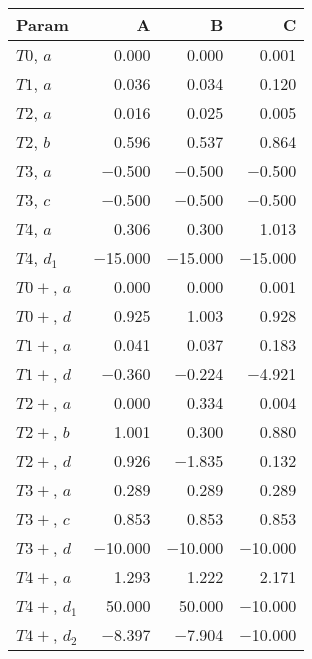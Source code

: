 \begin{tabular}{lrrr}
\toprule
 Param        &       A &       B &       C \\
\midrule
 $T0$, $a$    &   \num{0.000} &   \num{0.000} &   \num{0.001} \\
 $T1$, $a$    &   \num{0.036} &   \num{0.034} &   \num{0.120} \\
 $T2$, $a$    &   \num{0.016} &   \num{0.025} &   \num{0.005} \\
 $T2$, $b$    &   \num{0.596} &   \num{0.537} &   \num{0.864} \\
 $T3$, $a$    &  \num{-0.500} &  \num{-0.500} &  \num{-0.500} \\
 $T3$, $c$    &  \num{-0.500} &  \num{-0.500} &  \num{-0.500} \\
 $T4$, $a$    &   \num{0.306} &   \num{0.300} &   \num{1.013} \\
 $T4$, $d_1$  & \num{-15.000} & \num{-15.000} & \num{-15.000} \\
 $T0+$, $a$   &   \num{0.000} &   \num{0.000} &   \num{0.001} \\
 $T0+$, $d$   &   \num{0.925} &   \num{1.003} &   \num{0.928} \\
 $T1+$, $a$   &   \num{0.041} &   \num{0.037} &   \num{0.183} \\
 $T1+$, $d$   &  \num{-0.360} &  \num{-0.224} &  \num{-4.921} \\
 $T2+$, $a$   &   \num{0.000} &   \num{0.334} &   \num{0.004} \\
 $T2+$, $b$   &   \num{1.001} &   \num{0.300} &   \num{0.880} \\
 $T2+$, $d$   &   \num{0.926} &  \num{-1.835} &   \num{0.132} \\
 $T3+$, $a$   &   \num{0.289} &   \num{0.289} &   \num{0.289} \\
 $T3+$, $c$   &   \num{0.853} &   \num{0.853} &   \num{0.853} \\
 $T3+$, $d$   & \num{-10.000} & \num{-10.000} & \num{-10.000} \\
 $T4+$, $a$   &   \num{1.293} &   \num{1.222} &   \num{2.171} \\
 $T4+$, $d_1$ &  \num{50.000} &  \num{50.000} & \num{-10.000} \\
 $T4+$, $d_2$ &  \num{-8.397} &  \num{-7.904} & \num{-10.000} \\
\bottomrule
\end{tabular}
